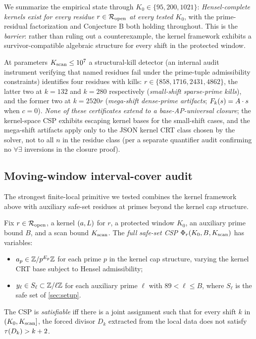 We summarize the empirical state through $K_0 \in \{95, 200, 1021\}$:
\emph{Hensel-complete kernels exist for every residue
$r \in \mathcal{R}_{\mathrm{open}}$ at every tested $K_0$}, with the prime-residual
factorization and Conjecture B both holding throughout. This is the
\emph{barrier}: rather than ruling out a counterexample, the kernel
framework exhibits a survivor-compatible algebraic structure for
every shift in the protected window.

\begin{remark}
\label{rem:class-specific-struct-certs}
At parameters $K_{\rm scan} \le 10^7$ a structural-kill detector
(an internal audit instrument verifying that named residues fail
under the prime-tuple admissibility constraints) identifies four
residues with kills: $r \in \{858, 1716, 2431, 4862\}$, the latter two at
$k = 132$ and $k = 280$ respectively (\emph{small-shift sparse-prime
kills}), and the former two at $k = 2520 r$ (\emph{mega-shift dense-prime
artifacts}; $F_k(s) = A \cdot s$ when $c = 0$). \emph{None of
these certificates extend to a base-AP-universal closure}; the
kernel-space CSP exhibits escaping kernel bases for the small-shift
cases, and the mega-shift artifacts apply only to the JSON kernel
CRT class chosen by the solver, not to all $n$ in the residue class
(per a separate quantifier audit confirming no $\forall \exists$ inversions in the closure proof).
\end{remark}

\subsection{Moving-window interval-cover audit}
\label{sec:interval-cover-audit}

The strongest finite-local primitive we tested combines the kernel
framework above with auxiliary safe-set residues at primes beyond
the kernel cap structure.

\begin{definition}
\label{def:full-safe-set-csp}
Fix $r \in \mathcal{R}_{\mathrm{open}}$, a kernel $(a, L)$ for $r$, a protected
window $K_0$, an auxiliary prime bound $B$, and a scan bound
$K_{\rm scan}$. The \emph{full safe-set CSP} $\Phi_r(K_0, B,
K_{\rm scan})$ has variables:
\begin{itemize}[leftmargin=*]
\item $a_p \in \mathbb{Z} / p^{E_p}\mathbb{Z}$ for each prime $p$ in the kernel
  cap structure, varying the kernel CRT base subject to Hensel
  admissibility;
\item $y_\ell \in S_\ell \subset \mathbb{Z} / \ell\mathbb{Z}$ for each auxiliary
  prime $\ell$ with $89 < \ell \le B$, where $S_\ell$ is the safe
  set of \cref{sec:setup}.
\end{itemize}
The CSP is \emph{satisfiable} iff there is a joint assignment such
that for every shift $k$ in $(K_0, K_{\rm scan}]$, the forced
divisor $D_k$ extracted from the local data does not satisfy
$\tau(D_k) > k + 2$.
\end{definition}


